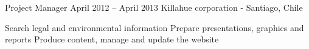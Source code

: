 \begin{joblist}[13.2][7.8][3.4]
\item[Project Manager]{April 2012 -- April 2013 }
	{
    Killahue corporation - Santiago, Chile
    }     
	{
        \vspace{-0.5cm}
		\iftbftiny \setlength{\parskip}{-10pt} \fi
		\begin{itemize}
			  \iftbftiny \setlength\itemsep{-3pt} \fi
			  \cvitem[\checkmark] Search legal and environmental information
			  \cvitem[\checkmark] Prepare presentations, graphics and reports
			  \cvitem[\checkmark] Produce content, manage and update the website
		\end{itemize}      
	}
  
       

   

\end{joblist}

%
%

